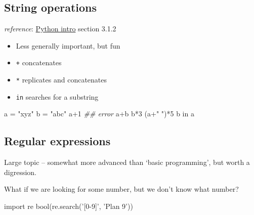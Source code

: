 \documentclass[]{tufte-handout}
\newenvironment{Shaded}{}{}
\newcommand{\DataTypeTok}[1]{\textcolor[rgb]{0.56,0.13,0.00}{{#1}}}
\newcommand{\DecValTok}[1]{\textcolor[rgb]{0.25,0.63,0.44}{{#1}}}
\newcommand{\CharTok}[1]{\textcolor[rgb]{0.25,0.44,0.63}{{#1}}}
\newcommand{\StringTok}[1]{\textcolor[rgb]{0.25,0.44,0.63}{{#1}}}
\newcommand{\CommentTok}[1]{\textcolor[rgb]{0.38,0.63,0.69}{\textit{{#1}}}}
\newcommand{\NormalTok}[1]{{#1}}
\begin{document}
\subsection{String operations}\label{string-operations}

\emph{reference}:
\href{https://docs.python.org/3/tutorial/introduction.html}{Python
intro} section 3.1.2

\begin{itemize}
\itemsep1pt\parskip0pt
\item
  Less generally important, but fun
\item
  \texttt{+} concatenates
\item
  \texttt{*} replicates and concatenates
\item
  \texttt{in} searches for a substring
\end{itemize}

\begin{Shaded}
\begin{Highlighting}[]
\NormalTok{a = }\StringTok{"xyz"}
\NormalTok{b = }\StringTok{"abc"}
\NormalTok{a}\DecValTok{+1}  \CommentTok{## error}
\NormalTok{a+b}
\NormalTok{b*}\DecValTok{3}
\NormalTok{(a+}\StringTok{" "}\NormalTok{)*}\DecValTok{5}
\NormalTok{b in a}
\end{Highlighting}
\end{Shaded}

\subsection{Regular expressions}\label{regular-expressions}

Large topic -- somewhat more advanced than `basic programming', but
worth a digression.

What if we are looking for some number, but we don't know what number?

\begin{Shaded}
\begin{Highlighting}[]
\CharTok{import} \NormalTok{re}
\DataTypeTok{bool}\NormalTok{(re.search(}\StringTok{'[0-9]'}\NormalTok{, }\StringTok{'Plan 9'}\NormalTok{))}
\end{Highlighting}
\end{Shaded}
\end{document}
